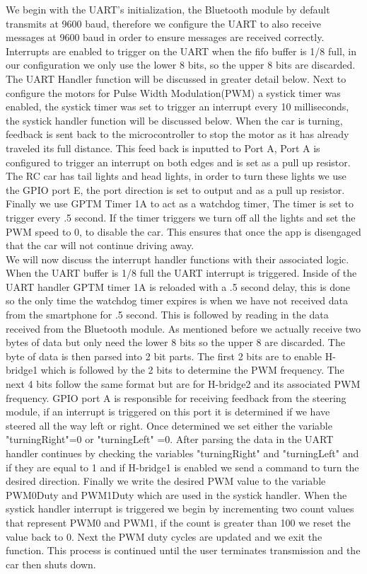 \documentclass[12pt]{article}
\begin{document}
We begin with the UART's initialization, the Bluetooth module by default transmits at 9600 baud, therefore we configure the UART to also receive messages at 9600 baud in order to ensure messages are received correctly. Interrupts are enabled to trigger on the UART when the fifo buffer is 1/8 full, in our configuration we only use the lower 8 bits, so the upper 8 bits are discarded. The UART Handler function will be discussed in greater detail below. Next to configure the motors for Pulse Width Modulation(PWM) a systick timer was enabled, the systick timer was set to trigger an interrupt every 10 milliseconds, the systick handler function will be discussed below. When the car is turning, feedback is sent back to the microcontroller to stop the motor as it has already traveled its full distance. This feed back is inputted to Port A, Port A is configured to trigger an interrupt on both edges and is set as a pull up resistor. The RC car has tail lights and head lights, in order to turn these lights we use the GPIO port E, the port direction is set to output and as a pull up resistor. Finally we use GPTM Timer 1A to act as a watchdog timer, The timer is set to trigger every .5 second. If the timer triggers we turn off all the lights and set the PWM speed to 0, to disable the car. This ensures that once the app is disengaged that the car will not continue driving away.\\

We will now discuss the interrupt handler functions with their associated logic. When the UART buffer is 1/8 full the UART interrupt is triggered. Inside of the UART handler GPTM timer 1A is reloaded with a .5 second delay, this is done so the only time the watchdog timer expires is when we have not received data from the smartphone for .5 second. This is followed by reading in the data received from the Bluetooth module. As mentioned before we actually receive two bytes of data but only need the lower 8 bits so the upper 8 are discarded. The byte of data is then parsed into 2 bit parts. The first 2 bits are to enable H-bridge1 which is followed by the 2 bits to determine the PWM frequency. The next 4 bits follow the same format but are for H-bridge2 and its associated PWM frequency. GPIO port A is responsible for receiving feedback from the steering module, if an interrupt is triggered on this port it is determined if we have steered all the way left or right. Once determined we set either the variable "turningRight"=0 or "turningLeft" =0. After parsing the data in the UART handler continues by checking the variables "turningRight" and "turningLeft" and if they are equal to 1 and if H-bridge1 is enabled we send a command to turn the desired direction. Finally we write the desired PWM value to the variable PWM0Duty and PWM1Duty which are used in the systick handler. When the systick handler interrupt is triggered we begin by incrementing two count values that represent PWM0 and PWM1, if the count is greater than 100 we reset the value back to 0. Next the PWM duty cycles are updated and we exit the function. This process is continued until the user terminates transmission and the car then shuts down.  
\end{document}
